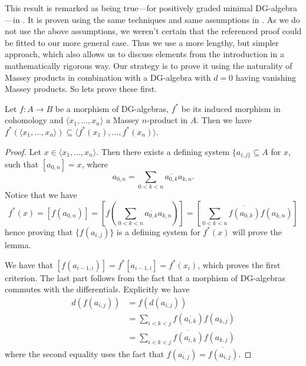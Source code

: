 This result is remarked as being true---for positively graded minimal DG-algebra---in \cite[Theorem 4.1.]{DGMS}. It is proven using the same techniques and same assumptions in \cite[Theorem 1.6.5]{exact-massey}. As we do not use the above assumptions, we weren't certain that the referenced proof could be fitted to our more general case. Thus we use a more lengthy, but simpler approach, which also allows us to discuss elements from the introduction in a mathematically rigorous way. Our strategy is to prove it using the naturality of Massey products in combination with a DG-algebra with $d=0$ having vanishing Massey products. So lets prove these first.

\begin{lemma}
\label{lm:naturality_of_massey}
Let $f\colon A\longrightarrow B$ be a morphism of DG-algebras, $f^*$ be its induced morphism in cohomology and $\langle x_1, \ldots, x_n\rangle $ a Massey $n$-product in $A$. Then we have $f^*( \langle x_1, \ldots, x_n\rangle) \subseteq \langle f^*(x_1), \ldots, f^*(x_n)\rangle$. 
\end{lemma}
\begin{proof}
Let $x\in \langle x_1, \ldots, x_n\rangle$. Then there exists a defining system $\{a_{i,j\}}\subseteq A$ for $x$, such that $[a_{0,n}] = x$, where  
\begin{equation*}
    a_{0,n} = \sum_{0<k<n}\overline{a_{0,k}}a_{k,n}.
\end{equation*}
Notice that we have 
\begin{equation*}
    f^*(x) = [f(a_{0,n})] = [f(\sum_{0<k<n}\overline{a_{0,k}}a_{k,n})] = [\sum_{0<k<n}\overline{f(a_{0,k})}f(a_{k,n})]
\end{equation*}
hence proving that $\{ f(a_{i,j})\}$ is a defining system for $f^*(x)$ will prove the lemma. 

We have that $[f(a_{i-1,i})] = f^*[a_{i-1,i}] = f^*(x_i)$, which proves the first criterion. The last part follows from the fact that a morphism of DG-algebras commutes with the differentials. Explicitly we have
\begin{align*}
    d(f(a_{i,j}))
    &= f(d(a_{i,j})) \\
    &= \sum_{i<k<j}f(\overline{a_{i,k}})f(a_{k,j}) \\
    &= \sum_{i<k<j}\overline{f(a_{i,k})}f(a_{k,j})
\end{align*}
where the second equality uses the fact that $f(\overline{a_{i,j}}) = \overline{f(a_{i,j})}$. 
\end{proof}

